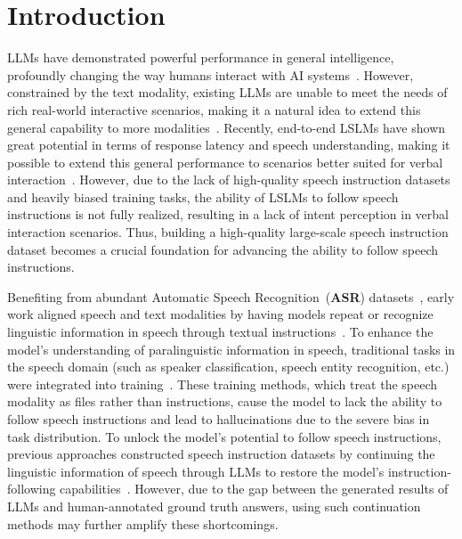 \documentclass[11pt]{article}
\begin{document}
	\section{Introduction}
	LLMs have demonstrated powerful performance in general intelligence, profoundly changing the way humans interact with AI systems~\citep{openai2024gpt4technicalreport,abdin2024phi3technicalreporthighly,dubey2024llama3herdmodels}. 
	However, constrained by the text modality, existing LLMs are unable to meet the needs of rich real-world interactive scenarios, making it a natural idea to extend this general capability to more modalities~\citep{fang2024llamaomniseamlessspeechinteraction}. 
	Recently, end-to-end LSLMs have shown great potential in terms of response latency and speech understanding, making it possible to extend this general performance to scenarios better suited for verbal interaction~\citep{chu2023qwenaudioadvancinguniversalaudio,chu2024qwen2audiotechnicalreport,zhang2023speechgptempoweringlargelanguage,fathullah2024audiochatllamageneralpurposespeechabilities}. 
	However, due to the lack of high-quality speech instruction datasets and heavily biased training tasks, the ability of LSLMs to follow speech instructions is not fully realized, resulting in a lack of intent perception in verbal interaction scenarios. 
	Thus, building a high-quality large-scale speech instruction dataset becomes a crucial foundation for advancing the ability to follow speech instructions.
	
	Benefiting from abundant Automatic Speech Recognition~(\textbf{ASR}) datasets~\citep{commonvoice:2020,Pratap2020MLSAL,GigaSpeech2021,wang2024globe}, early work aligned speech and text modalities by having models repeat or recognize linguistic information in speech through textual instructions~\citep{gong2023jointaudiospeechunderstanding}. 
	To enhance the model’s understanding of paralinguistic information in speech, traditional tasks in the speech domain (such as speaker classification, speech entity recognition, etc.) were integrated into training~\citep{chu2023qwenaudioadvancinguniversalaudio,tang2024salmonngenerichearingabilities,das2024speechverselargescalegeneralizableaudio}. 
	These training methods, which treat the speech modality as files rather than instructions, cause the model to lack the ability to follow speech instructions and lead to hallucinations due to the severe bias in task distribution. 
	To unlock the model's potential to follow speech instructions, previous approaches constructed speech instruction datasets by continuing the linguistic information of speech through LLMs to restore the model's instruction-following capabilities~\citep{fathullah2024audiochatllamageneralpurposespeechabilities}. 
	However, due to the gap between the generated results of LLMs and human-annotated ground truth answers, using such continuation methods may further amplify these shortcomings.
\end{document}
